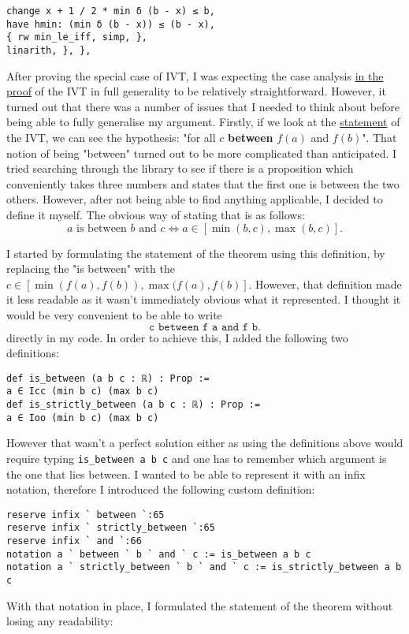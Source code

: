 \documentclass[11pt]{article}
\begin{document}
\begin{verbatim}
change x + 1 / 2 * min δ (b - x) ≤ b,
have hmin: (min δ (b - x)) ≤ (b - x),
{ rw min_le_iff, simp, },
linarith, }, },
\end{verbatim}
After proving the special case of IVT, I was expecting the case analysis
\hyperlink{general_cases}{in the proof} of the IVT in full generality to be
relatively straightforward. However, it turned out that there was a number of
issues that I needed to think about before being able to fully generalise my
argument. Firstly, if we look at the \hyperlink{statement}{statement} of the
IVT, we can see the hypothesis: "for all $c$ \textbf{between} $f(a)$ and
$f(b)$". That notion of being "between" turned out to be more complicated than
anticipated. I tried searching through the library to see if there is a
proposition which conveniently takes three numbers and states that the first
one is between the two others. However, after not being able to find anything
applicable, I decided to define it myself. The obvious way of stating that is
as follows: \[ a \text{ is between } b \text{ and } c \iff a \in [\min(b, c),
\max(b,c)] .\]

I started by formulating the statement of the theorem using this definition,
by replacing the "is between" with the $c \in [\min(f(a), f(b)),
\max(f(a),f(b)]$. However, that definition made it less readable as it wasn't
immediately obvious what it represented. I thought it would be very
convenient to be able to write \[ \texttt{c between f a and f b} .\] directly
in my code. In order to achieve this, I added the following two definitions:

\begin{verbatim}
def is_between (a b c : ℝ) : Prop :=
a ∈ Icc (min b c) (max b c)
def is_strictly_between (a b c : ℝ) : Prop :=
a ∈ Ioo (min b c) (max b c)
\end{verbatim}
However that wasn't a perfect solution either as using the definitions above
would require typing \texttt{is\_between a b c} and one has to remember which
argument is the one that lies between. I wanted to be able to represent it with
an infix notation, therefore I introduced the following custom definition:

\begin{verbatim}
reserve infix ` between `:65
reserve infix ` strictly_between `:65
reserve infix ` and `:66
notation a ` between ` b ` and ` c := is_between a b c
notation a ` strictly_between ` b ` and ` c := is_strictly_between a b c
\end{verbatim}
With that notation in place, I formulated the statement of the theorem without losing any readability:
\end{document}
